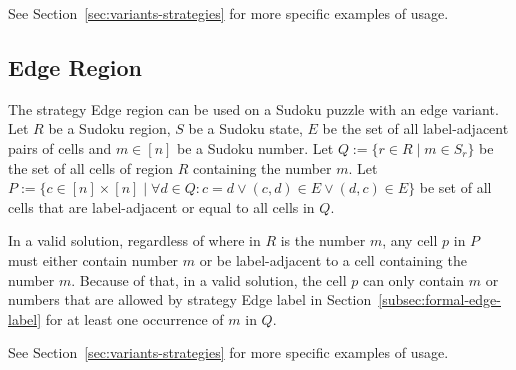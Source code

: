 See Section~\ref{sec:variants-strategies} for more specific examples of usage.

\subsection{Edge Region}

The strategy Edge region can be used on a Sudoku puzzle with an edge variant.
Let $R$ be a Sudoku region, $S$ be a Sudoku state, $E$ be the set of all label-adjacent pairs of cells
and $m \in [n]$ be a Sudoku number.
Let $Q := \{r \in R \mid m \in S_r\}$ be the set of all cells of region $R$ containing the number $m$.
Let $P := \{c \in [n] \times [n] \mid \forall d \in Q:  c = d \lor (c, d) \in E \lor (d, c) \in E\}$ be set of all cells
that are label-adjacent or equal to all cells in $Q$.

In a valid solution, regardless of where in $R$ is the number $m$, any cell $p$ in $P$ must either contain number $m$
or be label-adjacent to a cell containing the number $m$.
Because of that, in a valid solution, the cell $p$ can only contain $m$
or numbers that are allowed by strategy Edge label in Section~\ref{subsec:formal-edge-label}
for at least one occurrence of $m$ in $Q$.

See Section~\ref{sec:variants-strategies} for more specific examples of usage.
